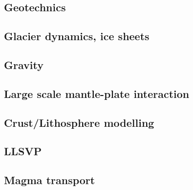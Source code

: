\subsection*{Geotechnics}

\cite{zhll03}

\subsection*{Glacier dynamics, ice sheets}

\cite{asbl06}
\cite{zhjg11}
\cite{lejx14}
\cite{issg15}

\subsection*{Gravity}

\cite{zhou08}

\subsection*{Large scale mantle-plate interaction}

\cite{algs12}

\subsection*{Crust/Lithosphere modelling}

\cite{nefo93}
\cite{lecd98}
\cite{hanl00}\cite{labp00}
\cite{homo01}
\cite{labu02}
\cite{hagu05}
\cite{libi06}
\cite{afrf07}
\cite{affr08}
\cite{hapo08}
\cite{hamo10}
\cite{kava14}

\subsection*{LLSVP}

\cite{limc13}

\subsection*{Magma transport}

